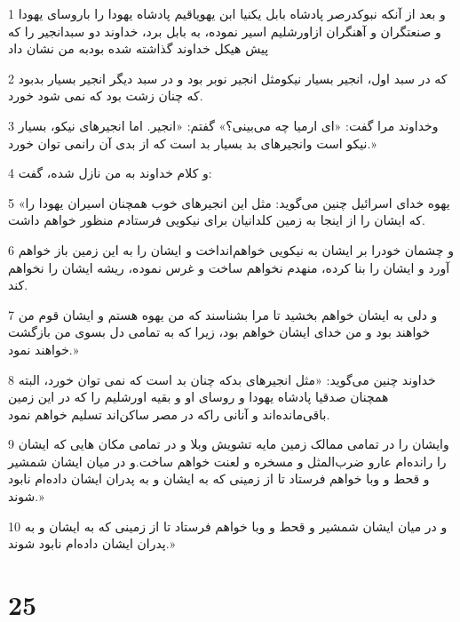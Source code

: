 \par 1 و بعد از آنکه نبوکدرصر پادشاه بابل یکنیا ابن یهویاقیم پادشاه یهودا را باروسای یهودا و صنعتگران و آهنگران ازاورشلیم اسیر نموده، به بابل برد، خداوند دو سبدانجیر را که پیش هیکل خداوند گذاشته شده بودبه من نشان داد
\par 2 که در سبد اول، انجیر بسیار نیکومثل انجیر نوبر بود و در سبد دیگر انجیر بسیار بدبود که چنان زشت بود که نمی شود خورد.
\par 3 وخداوند مرا گفت: «ای ارمیا چه می‌بینی؟» گفتم: «انجیر. اما انجیرهای نیکو، بسیار نیکو است وانجیرهای بد بسیار بد است که از بدی آن رانمی توان خورد.»
\par 4 و کلام خداوند به من نازل شده، گفت:
\par 5 «یهوه خدای اسرائیل چنین می‌گوید: مثل این انجیرهای خوب همچنان اسیران یهودا را که ایشان را از اینجا به زمین کلدانیان برای نیکویی فرستادم منظور خواهم داشت.
\par 6 و چشمان خودرا بر ایشان به نیکویی خواهم‌انداخت و ایشان را به این زمین باز خواهم آورد و ایشان را بنا کرده، منهدم نخواهم ساخت و غرس نموده، ریشه ایشان را نخواهم کند.
\par 7 و دلی به ایشان خواهم بخشید تا مرا بشناسند که من یهوه هستم و ایشان قوم من خواهند بود و من خدای ایشان خواهم بود، زیرا که به تمامی دل بسوی من بازگشت خواهند نمود.»
\par 8 خداوند چنین می‌گوید: «مثل انجیرهای بدکه چنان بد است که نمی توان خورد، البته همچنان صدقیا پادشاه یهودا و روسای او و بقیه اورشلیم را که در این زمین باقی‌مانده‌اند و آنانی راکه در مصر ساکن‌اند تسلیم خواهم نمود.
\par 9 وایشان را در تمامی ممالک زمین مایه تشویش وبلا و در تمامی مکان هایی که ایشان را رانده‌ام عارو ضرب‌المثل و مسخره و لعنت خواهم ساخت.و در میان ایشان شمشیر و قحط و وبا خواهم فرستاد تا از زمینی که به ایشان و به پدران ایشان داده‌ام نابود شوند.»
\par 10 و در میان ایشان شمشیر و قحط و وبا خواهم فرستاد تا از زمینی که به ایشان و به پدران ایشان داده‌ام نابود شوند.»
 
\chapter{25}

